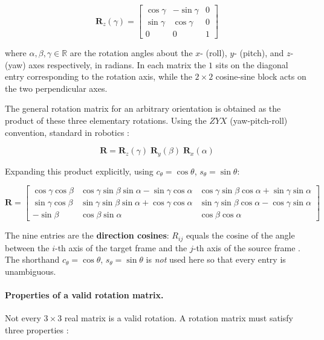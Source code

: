 \begin{equation}
\label{eq:Rz}
\mathbf{R}_z(\gamma) =
\begin{bmatrix}
\cos\gamma & -\sin\gamma & 0 \\
\sin\gamma &  \cos\gamma & 0 \\
0          &  0          & 1
\end{bmatrix}
\end{equation}

where $\alpha,\beta,\gamma\in\mathbb{R}$ are the rotation angles about the
$x$- (roll), $y$- (pitch), and $z$- (yaw) axes respectively, in radians.
In each matrix the $1$ sits on the diagonal entry corresponding to the
rotation axis, while the $2\times2$ cosine-sine block acts on the two
perpendicular axes.

The general rotation matrix for an arbitrary orientation is obtained as
the product of these three elementary rotations.
Using the $ZYX$ (yaw-pitch-roll) convention, standard in robotics
\cite{Siciliano2009}:

\begin{equation}
\label{eq:rot_general}
\mathbf{R} = \mathbf{R}_z(\gamma)\;\mathbf{R}_y(\beta)\;\mathbf{R}_x(\alpha)
\end{equation}

Expanding this product explicitly, using $c_\theta=\cos\theta$,
$s_\theta=\sin\theta$:

\begin{equation}
\label{eq:rot_full}
\mathbf{R} =
\begin{bmatrix}
\cos\gamma\cos\beta &
  \cos\gamma\sin\beta\sin\alpha - \sin\gamma\cos\alpha &
  \cos\gamma\sin\beta\cos\alpha + \sin\gamma\sin\alpha \\[6pt]
\sin\gamma\cos\beta &
  \sin\gamma\sin\beta\sin\alpha + \cos\gamma\cos\alpha &
  \sin\gamma\sin\beta\cos\alpha - \cos\gamma\sin\alpha \\[6pt]
-\sin\beta &
  \cos\beta\sin\alpha &
  \cos\beta\cos\alpha
\end{bmatrix}
\end{equation}

The nine entries are the \textbf{direction cosines}: $R_{ij}$ equals
the cosine of the angle between the $i$-th axis of the target frame
and the $j$-th axis of the source frame \cite{Craig2005}.
The shorthand $c_\theta=\cos\theta$, $s_\theta=\sin\theta$ is
\emph{not} used here so that every entry is unambiguous.

\paragraph{Properties of a valid rotation matrix.}
Not every $3\times3$ real matrix is a valid rotation.
A rotation matrix must satisfy three properties \cite{Siciliano2009}:

